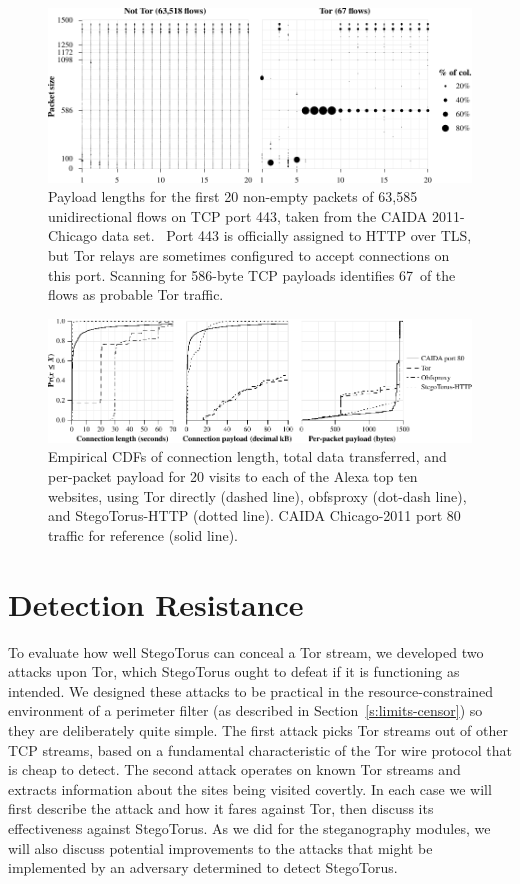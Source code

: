 
\begin{figure}[t!]
\centering
\includegraphics{figures/https-patterns-c}
\caption{Payload lengths for the first 20 non-empty packets of 63,585
  unidirectional flows on TCP port 443, taken from the CAIDA
  2011-Chicago data set.~\cite{d-caida} Port 443 is officially assigned
  to HTTP over TLS, but Tor relays are sometimes configured to accept
  connections on this port. Scanning for 586-byte TCP payloads
  identifies 67~of the flows as probable Tor traffic.}\label{f:packetlengths}
\end{figure}

\begin{figure}[t!]
\centering
\includegraphics{plots/ecdf-cl-bw-pl}
\caption{Empirical CDFs of connection length, total data transferred,
  and per-packet payload for 20 visits to each of the Alexa top ten
  websites, using Tor directly (dashed line), obfsproxy (dot-dash
  line), and StegoTorus-HTTP (dotted line).  CAIDA Chicago-2011 port
  80 traffic for reference (solid line).} \label{fig:ECDFs}
\end{figure}

\section{Detection Resistance}\label{s:attacks}

To evaluate how well StegoTorus can conceal a Tor stream, we developed
two attacks upon Tor, which StegoTorus ought to defeat if it is
functioning as intended.  We designed these attacks to be practical in
the resource-constrained environment of a perimeter filter (as
described in Section~\ref{s:limits-censor}) so they are deliberately
quite simple.  The first attack picks Tor streams out of other TCP
streams, based on a fundamental characteristic of the Tor wire
protocol that is cheap to detect.  The second attack operates on known
Tor streams and extracts information about the sites being visited
covertly.  In each case we will first describe the attack and how it
fares against Tor, then discuss its effectiveness against StegoTorus.
As we did for the steganography modules, we will also discuss
potential improvements to the attacks that might be implemented by an
adversary determined to detect StegoTorus.

